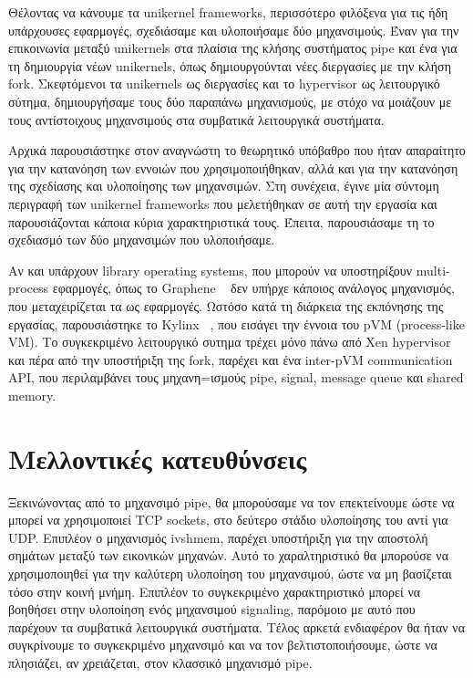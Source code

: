 Θέλοντας να κάνουμε τα unikernel frameworks, περισσότερο φιλόξενα για τις ήδη
υπάρχουσες εφαρμογές, σχεδιάσαμε και υλοποιήσαμε δύο μηχανσιμούς. Έναν για την
επικοινωνία μεταξύ unikernels στα πλαίσια της κλήσης συστήματος pipe και ένα για
τη δημιουργία νέων unikernels, όπως δημιουργούνται νέες διεργασίες με την κλήση
fork. Σκεφτόμενοι τα unikernels ως διεργασίες και το hypervisor ως λειτουργικό
σύτημα, δημιουργήσαμε τους δύο παραπάνω μηχανισμούς, με στόχο να μοιάζουν με
τους αντίστοιχους μηχανσιμούς στα συμβατικά λειτουργικά συστήματα.

Αρχικά παρουσιάστηκε στον αναγνώστη το θεωρητικό υπόβαθρο που ήταν απαραίτητο
για την κατανόηση των εννοιών που χρησιμοποιήθηκαν, αλλά και για την κατανόηση
της σχεδίασης και υλοποίησης των μηχανσιμών. Στη συνέχεια, έγινε μία σύντομη
περιγραφή των unikernel frameworks που μελετήθηκαν σε αυτή την εργασία και
παρουσιάζονται κάποια κύρια χαρακτηριστικά τους. Έπειτα, παρουσιάσαμε τη το
σχεδιασμό των δύο μηχανσιμών που υλοποιήσαμε. 

Αν και υπάρχουν library operating systems, που μπορούν να υποστηρίξουν
multi-process εφαρμογές, όπως το Graphene ~\cite{tsai2014cooperation} δεν υπήρχε
κάποιος ανάλογος μηχανισμός, που μεταχειρίζεται τα  ως εφαρμογές.
Ωστόσο κατά τη διάρκεια της εκπόνησης της εργασίας, παρουσιάστηκε το Kylinx
~\cite{zhang2018kylinx}, που εισάγει την έννοια του pVM (process-like VM). Το
συγκεκριμένο λειτουργικό συτημα τρέχει μόνο πάνω από Xen hypervisor και πέρα από
την υποστήριξη της fork, παρέχει και ένα inter-pVM communication API, που
περιλαμβάνει τους μηχανη=ισμούς pipe, signal, message queue και shared memory. 

\section{Μελλοντικές κατευθύνσεις}
Ξεκινώνοντας από το μηχανσιμό pipe, θα μπορούσαμε να τον επεκτείνουμε ώστε να
μπορεί να χρησιμοποιεί TCP sockets, στο δεύτερο στάδιο υλοποίησης του αντί για
UDP. Επιπλέον ο μηχανισμός ivshmem, παρέχει υποστήριξη για την αποστολή σημάτων
μεταξύ των εικονικών μηχανών. Αυτό το χαραλτηριστικό θα μπορούσε να
χρησιμοποιηθεί για την καλύτερη υλοποίηση του μηχανσιμού, ώστε να μη βασίζεται
τόσο στην κοινή μνήμη. Επιπλέον το συγκεκριμένο χαρακτηριστικό μπορεί να
βοηθήσει στην υλοποίηση ενός μηχανσιμού signaling, παρόμοιο με αυτό που παρέχουν
τα συμβατικά λειτουργικά συστήματα. Τέλος αρκετά ενδιαφέρον θα ήταν να
συγκρίνουμε το συγκεκριμένο μηχανσιμό και να τον βελτιστοποιήσουμε, ώστε να
πλησιάζει, αν χρειάζεται, στον κλασσικό μηχανισμό pipe.

